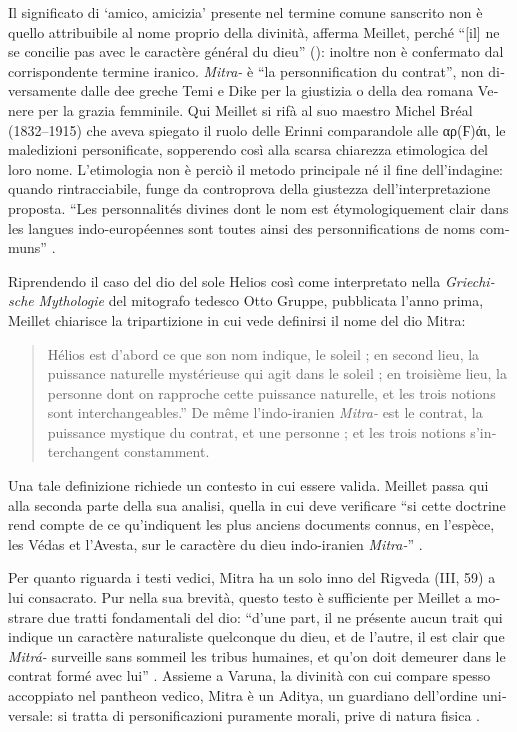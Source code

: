 \documentclass[french,output=paper,colorlinks,citecolor=brown]{../langscibook}
\begin{document}
\begin{otherlanguage}{italian}
Il significato di ‘amico, amicizia’ presente nel termine comune sanscrito non è quello attribuibile al nome proprio della divinità, afferma Meillet, perché “[il] ne se concilie pas avec le caractère général du dieu” (\citealt[145]{Meillet1907}): inoltre non è confermato dal corrispondente termine iranico. \textit{Mitra-} è “la personnification du contrat”, non diversamente dalle dee greche Temi e Dike per la giustizia o della dea romana Venere per la grazia femminile. Qui Meillet si rifà al suo maestro Michel Bréal (1832--1915) che aveva spiegato il ruolo delle Erinni comparandole alle αρ(Ϝ)άι, le maledizioni personificate, sopperendo così alla scarsa chiarezza etimologica del loro nome. L’etimologia non è perciò il metodo principale né il fine dell’indagine: quando rintracciabile, funge da controprova della giustezza dell’interpretazione proposta. “Les personnalités divines dont le nom est étymologiquement clair dans les langues indo-européennes sont toutes ainsi des personnifications de noms communs” \citep[145--146]{Meillet1907}.

Riprendendo il caso del dio del sole Helios così come interpretato nella \textit{Griechische} \textit{Mythologie} del mitografo tedesco Otto Gruppe, pubblicata l’anno prima, Meillet chiarisce la tripartizione in cui vede definirsi il nome del dio Mitra: 

\begin{quote}
    Hélios est d’abord ce que son nom indique, le soleil ; en second lieu, la puissance naturelle mystérieuse qui agit dans le soleil ; en troisième lieu, la personne dont on rapproche cette puissance naturelle, et les trois notions sont interchangeables.” De même l’indo-iranien \textit{Mitra-} est le contrat, la puissance mystique du contrat, et une personne ; et les trois notions s’interchangent constamment. \citep[146]{Meillet1907}
\end{quote}

Una tale definizione richiede un contesto in cui essere valida. Meillet passa qui alla seconda parte della sua analisi, quella in cui deve verificare “si cette doctrine rend compte de ce qu’indiquent les plus anciens documents connus, en l’espèce, les Védas et l’Avesta, sur le caractère du dieu indo-iranien \textit{Mitra-}” \citep[146]{Meillet1907}.

Per quanto riguarda i testi vedici, Mitra ha un solo inno del Rigveda (III, 59) a lui consacrato. Pur nella sua brevità, questo testo è sufficiente per Meillet a mostrare due tratti fondamentali del dio: “d’une part, il ne présente aucun trait qui indique un caractère naturaliste quelconque du dieu, et de l’autre, il est clair que \textit{Mitrá-} surveille sans sommeil les tribus humaines, et qu’on doit demeurer dans le contrat formé avec lui” \citep[147]{Meillet1907}. Assieme a Varuna, la divinità con cui compare spesso accoppiato nel pantheon vedico, Mitra è un Aditya, un guardiano dell’ordine universale: si tratta di personificazioni puramente morali, prive di natura fisica \citep[147]{Meillet1907}. 


\end{otherlanguage}
\end{document}
